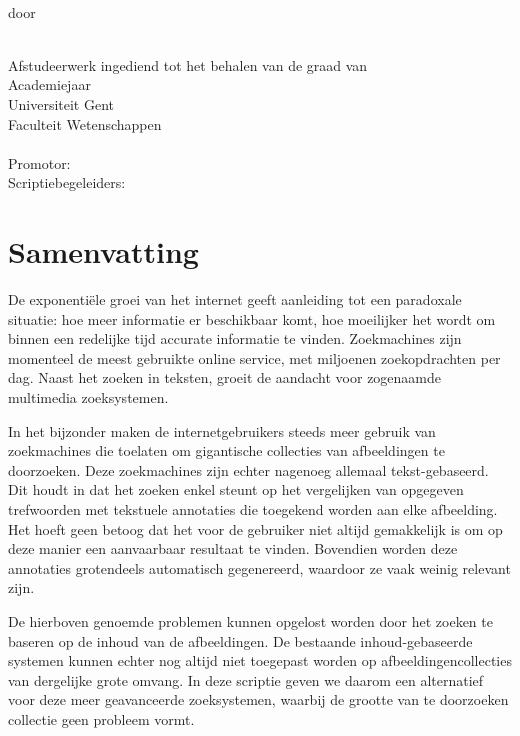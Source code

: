 \newpage
\thispagestyle{plain}

\begin{center}
{\sf\huge \titel }\\[3mm]
door\\
{\Large\auteur{}} \\
\end{center}
\noindent Afstudeerwerk ingediend tot het behalen van de graad van
\richting
\vspace{3mm}\\
Academiejaar \jaar
\vspace{3mm}\\
\noindent Universiteit Gent\\
Faculteit Wetenschappen\\
\vspace{3mm}\\
\noindent Promotor: \promotor\\
\noindent Scriptiebegeleiders: \begeleider\\
\vfill

\section*{Samenvatting}
De exponenti\"ele groei van het internet geeft aanleiding tot een paradoxale
situatie: hoe meer informatie er beschikbaar komt, hoe moeilijker het wordt
om binnen een redelijke tijd accurate informatie te vinden. Zoekmachines zijn momenteel
de meest gebruikte online service, met miljoenen zoekopdrachten per dag. Naast het zoeken
in teksten, groeit de aandacht voor zogenaamde multimedia zoeksystemen. 

In het bijzonder maken de internetgebruikers steeds meer gebruik van zoekmachines die toelaten om 
gigantische collecties van afbeeldingen te doorzoeken. Deze zoekmachines zijn echter nagenoeg 
allemaal tekst-gebaseerd. Dit houdt in dat het zoeken enkel steunt op het vergelijken van opgegeven 
trefwoorden met tekstuele annotaties die toegekend worden aan elke afbeelding. Het hoeft geen
betoog dat het voor de gebruiker niet altijd gemakkelijk is om op deze manier een aanvaarbaar 
resultaat te vinden. Bovendien worden deze annotaties grotendeels automatisch gegenereerd, 
waardoor ze vaak weinig relevant zijn.

De hierboven genoemde problemen kunnen opgelost worden door het zoeken te baseren op de inhoud 
van de afbeeldingen. De bestaande inhoud-gebaseerde systemen kunnen echter nog altijd niet 
toegepast worden op afbeeldingencollecties van dergelijke grote omvang. In deze scriptie geven 
we daarom een alternatief voor deze meer geavanceerde zoeksystemen, waarbij de grootte van 
te doorzoeken collectie geen probleem vormt. 


